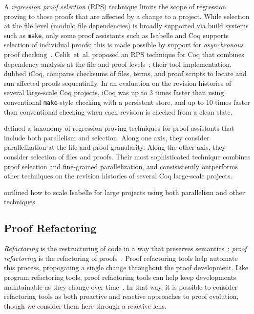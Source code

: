 A \emph{regression proof selection} (RPS) technique limits the scope of regression proving to those proofs that are affected by a change to a project. While selection at the file level (modulo file dependencies) is broadly supported via build systems such as \texttt{make}, only some proof assistants such as Isabelle and Coq supports selection of individual proofs; this is made possible by support for \emph{asynchronous} proof checking~\citep{Wenzel2014,Barras2015}. Celik~et~al. proposed an RPS technique for Coq that combines dependency analysis at the file and proof levels~\citep{Celik2017}; their tool implementation, dubbed iCoq, compares checksums of files, terms, and proof scripts to locate and run affected proofs sequentially. In an evaluation on the revision histories of several large-scale Coq projects, iCoq was up to 3 times faster than using conventional \texttt{make}-style checking with a persistent store, and up to 10 times faster than conventional checking when each revision is checked from a clean slate.

\cite{Palmskog2018} defined a taxonomy of regression proving techniques for proof assistants that include both parallelism and selection. Along one axis, they consider parallelization at the file and proof granularity. Along the other axis, they consider selection of files and proofs. Their most sophisticated technique combines proof selection and fine-grained parallelization, and consisistently outperforms other techniques on the revision histories of several Coq large-scale projects.

\cite{WenzelScalingIsabelle, WenzelFurtherScalingIsabelle} outlined how to scale Isabelle for large projects using both parallelism and other techniques.

\subsection{Proof Refactoring}
\label{sec:refactor}

\textit{Refactoring} is the restructuring of code in a way that preserves semantics~\citep{opdyke1992};
\textit{proof refactoring} is the refactoring of proofs~\citep{WhitesidePhD}.
Proof refactoring tools help automate this process, propogating a single change throughout the proof development.
Like program refactoring tools, proof refactoring tools can help keep developments
maintainable as they change over time~\citep{Bourke12}. In that way, it is possible to consider refactoring tools 
as both proactive and reactive approaches to proof evolution, though we consider them here through a reactive lens.

